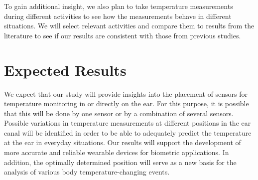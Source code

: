 To gain additional insight, we also plan to take temperature measurements during different activities to see how the measurements behave in different situations. We will select relevant activities and compare them to results from the literature to see if our results are consistent with those from previous studies.

\section{Expected Results}
We expect that our study will provide insights into the placement of sensors for temperature monitoring in or directly on the ear.
For this purpose, it is possible that this will be done by one sensor or by a combination of several sensors.
Possible variations in temperature measurements at different positions in the ear canal will be identified in order to be able to adequately predict the temperature at the ear in everyday situations.
Our results will support the development of more accurate and reliable wearable devices for biometric applications. 
In addition, the optimally determined position will serve as a new basis for the analysis of various body temperature-changing events.